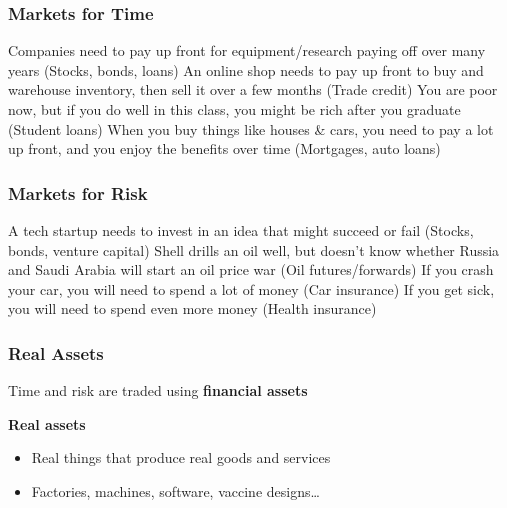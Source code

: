 \begin{frame}
\frametitle{Markets for Time}
\bi
\m Companies need to pay up front for equipment/research paying off over many years \pause (Stocks, bonds, loans) \pause
\m An online shop needs to pay up front to buy and warehouse inventory, then sell it over a few months \pause (Trade credit) \pause
\m You are poor now, but if you do well in this class, you might be rich after you graduate \pause (Student loans) \pause
\m When you buy things like houses \& cars, you need to pay a lot up front, and you enjoy the benefits over time \pause (Mortgages, auto loans) \pause
\ei
\end{frame}

\begin{frame}
\frametitle{Markets for Risk}
\bi 
\m A tech startup needs to invest in an idea that might succeed or fail \pause (Stocks, bonds, venture capital) \pause
\m Shell drills an oil well, but doesn't know whether Russia and Saudi Arabia will start an oil price war \pause (Oil futures/forwards) \pause
\m If you crash your car, you will need to spend a lot of money \pause (Car insurance) \pause
\m If you get sick, you will need to spend even more money \pause (Health insurance)
\ei
\end{frame}

\begin{frame}
\frametitle{Real Assets}

Time and risk are traded using \textbf{financial assets}\pause

\vspace{2ex}

\textbf{Real assets}
\begin{itemize}
\item Real things that produce real goods and services 
\item Factories, machines, software, vaccine designs\ldots
\end{itemize} 

\end{frame}

